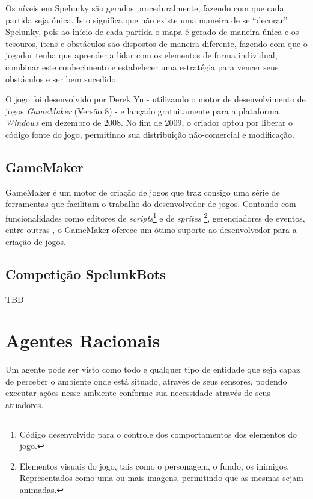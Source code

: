 Os níveis em Spelunky são gerados proceduralmente, fazendo com que cada partida
seja única. Isto significa que não existe uma maneira de se ``decorar'' Spelunky,
pois ao início de cada partida o mapa é gerado de maneira única e os tesouros,
itens e obstáculos são dispostos de maneira diferente, fazendo com que o jogador
tenha que aprender a lidar com os elementos de forma individual, combinar este
conhecimento e estabelecer uma estratégia para vencer seus obstáculos e ser bem
sucedido.

O jogo foi desenvolvido por Derek Yu - utilizando o motor de desenvolvimento de
jogos \textit{GameMaker} (Versão 8) - e lançado gratuitamente para a plataforma
\textit{Windows} em dezembro de 2008\cite{SPELUNKYRELEASE}. No fim de 2009, o
criador optou por liberar o código fonte do jogo, permitindo sua distribuição
não-comercial e modificação\cite{SPELUNKYLICENSE}.


\subsection{GameMaker}

GameMaker é um motor de criação de jogos que traz consigo uma série de
ferramentas que facilitam o trabalho do desenvolvedor de jogos. Contando com
funcionalidades como editores de \textit{scripts}\footnote{Código desenvolvido
para o controle dos comportamentos dos elementos do jogo.} e de \textit{sprites}
\footnote{Elementos visuais do jogo, tais como o personagem, o fundo, os
inimigos. Representados como uma ou mais imagens, permitindo que as mesmas sejam
animadas.}, gerenciadores de eventos, entre outras \cite{GMAKER8DOCS}, o
GameMaker oferece um ótimo suporte ao desenvolvedor para a criação de jogos.

\subsection{Competição SpelunkBots}

TBD

\section{Agentes Racionais}

Um agente pode ser visto como todo e qualquer tipo de entidade que seja capaz de
perceber o ambiente onde está situado, através de seus sensores, podendo
executar ações nesse ambiente conforme sua necessidade através de seus
atuadores.\cite{Russell:1995:AIM:193191}

